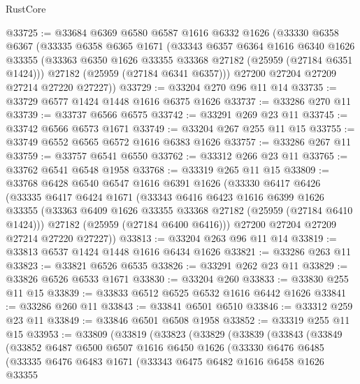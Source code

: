 \begin{lexlean}{RustCore}
\begin{coremodule}
@33725 := @33684
    @6369
    @6580
    @6587
    @1616
    @6332
    @1626
    (@33330
      @6358
      @6367
      (@33335
        @6358
        @6365
        @1671
        (@33343
          @6357
          @6364
          @1616
          @6340
          @1626
          @33355
          (@33363 @6350 @1626 @33355 @33368 @27182 (@25959 (@27184 @6351 @1424)))
          @27182
          (@25959 (@27184 @6341 @6357)))
        @27200
        @27204
        @27209
        @27214
        @27220
        @27227))
@33729 := @33204 @270 @96 @11 @14
@33735 := @33729 @6577 @1424 @1448 @1616 @6375 @1626
@33737 := @33286 @270 @11
@33739 := @33737 @6566 @6575
@33742 := @33291 @269 @23 @11
@33745 := @33742 @6566 @6573 @1671
@33749 := @33204 @267 @255 @11 @15
@33755 := @33749 @6552 @6565 @6572 @1616 @6383 @1626
@33757 := @33286 @267 @11
@33759 := @33757 @6541 @6550
@33762 := @33312 @266 @23 @11
@33765 := @33762 @6541 @6548 @1958
@33768 := @33319 @265 @11 @15
@33809 := @33768
    @6428
    @6540
    @6547
    @1616
    @6391
    @1626
    (@33330
      @6417
      @6426
      (@33335
        @6417
        @6424
        @1671
        (@33343
          @6416
          @6423
          @1616
          @6399
          @1626
          @33355
          (@33363 @6409 @1626 @33355 @33368 @27182 (@25959 (@27184 @6410 @1424)))
          @27182
          (@25959 (@27184 @6400 @6416)))
        @27200
        @27204
        @27209
        @27214
        @27220
        @27227))
@33813 := @33204 @263 @96 @11 @14
@33819 := @33813 @6537 @1424 @1448 @1616 @6434 @1626
@33821 := @33286 @263 @11
@33823 := @33821 @6526 @6535
@33826 := @33291 @262 @23 @11
@33829 := @33826 @6526 @6533 @1671
@33830 := @33204 @260
@33833 := @33830 @255 @11 @15
@33839 := @33833 @6512 @6525 @6532 @1616 @6442 @1626
@33841 := @33286 @260 @11
@33843 := @33841 @6501 @6510
@33846 := @33312 @259 @23 @11
@33849 := @33846 @6501 @6508 @1958
@33852 := @33319 @255 @11 @15
@33953 := @33809
    (@33819
      (@33823
        (@33829
          (@33839
            (@33843
              (@33849
                (@33852
                  @6487
                  @6500
                  @6507
                  @1616
                  @6450
                  @1626
                  (@33330
                    @6476
                    @6485
                    (@33335
                      @6476
                      @6483
                      @1671
                      (@33343
                        @6475
                        @6482
                        @1616
                        @6458
                        @1626
                        @33355

\end{coremodule}
\end{lexlean}
